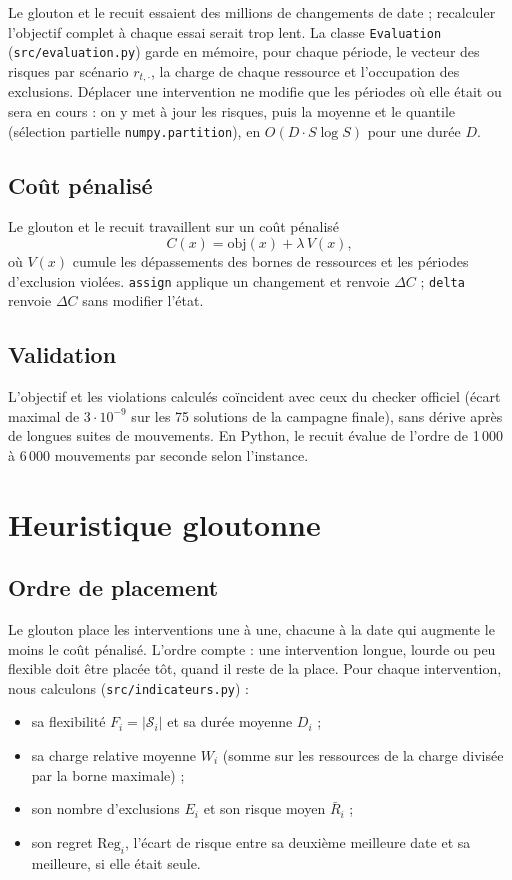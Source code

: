 \documentclass[11pt,a4paper]{report}
\newcommand{\Sd}{\mathcal{S}}
\newcommand{\obj}{\mathrm{obj}}
\begin{document}
Le glouton et le recuit essaient des millions de changements de date ; recalculer l'objectif
complet à chaque essai serait trop lent. La classe \texttt{Evaluation} (\texttt{src/evaluation.py})
garde en mémoire, pour chaque période, le vecteur des risques par scénario $r_{t,\cdot}$, la charge
de chaque ressource et l'occupation des exclusions. Déplacer une intervention ne modifie que les
périodes où elle était ou sera en cours : on y met à jour les risques, puis la moyenne et le
quantile (sélection partielle \texttt{numpy.partition}), en $O(D \cdot S \log S)$ pour une durée $D$.

\section{Coût pénalisé}

Le glouton et le recuit travaillent sur un coût pénalisé
\[
  C(x) = \obj(x) + \lambda \, V(x),
\]
où $V(x)$ cumule les dépassements des bornes de ressources et les périodes d'exclusion violées.
\texttt{assign} applique un changement et renvoie $\Delta C$ ; \texttt{delta} renvoie $\Delta C$ sans
modifier l'état.

\section{Validation}

L'objectif et les violations calculés coïncident avec ceux du checker officiel (écart maximal de
$3 \cdot 10^{-9}$ sur les 75 solutions de la campagne finale), sans dérive après de longues suites
de mouvements. En Python, le recuit évalue de l'ordre de 1\,000 à 6\,000 mouvements par seconde selon
l'instance.

\chapter{Heuristique gloutonne}\label{chap:glouton}

\section{Ordre de placement}

Le glouton place les interventions une à une, chacune à la date qui augmente le moins le coût
pénalisé. L'ordre compte : une intervention longue, lourde ou peu flexible doit être placée tôt,
quand il reste de la place. Pour chaque intervention, nous calculons (\texttt{src/indicateurs.py}) :
\begin{itemize}
  \item sa flexibilité $F_i = |\Sd_i|$ et sa durée moyenne $D_i$ ;
  \item sa charge relative moyenne $W_i$ (somme sur les ressources de la charge divisée par la borne
        maximale) ;
  \item son nombre d'exclusions $E_i$ et son risque moyen $\bar R_i$ ;
  \item son regret $\mathrm{Reg}_i$, l'écart de risque entre sa deuxième meilleure date et sa
        meilleure, si elle était seule.
\end{itemize}
\end{document}
